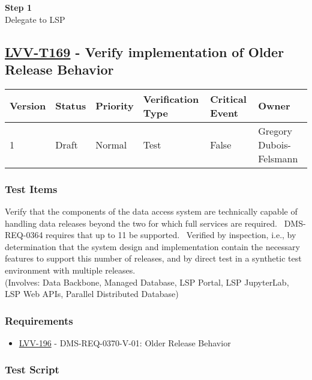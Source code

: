 \textbf{Step 1}\\
Delegate to LSP\\[2\baselineskip]

\hypertarget{lvv-t169---verify-implementation-of-older-release-behavior}{\subsection{\texorpdfstring{\href{https://jira.lsstcorp.org/secure/Tests.jspa\#/testCase/LVV-T169}{LVV-T169}
- Verify implementation of Older Release
Behavior}{LVV-T169 - Verify implementation of Older Release Behavior}}\label{lvv-t169---verify-implementation-of-older-release-behavior}}

\begin{longtable}[]{@{}llllll@{}}
\toprule
Version & Status & Priority & Verification Type & Critical Event &
Owner\tabularnewline
\midrule
\endhead
1 & Draft & Normal & Test & False & Gregory
Dubois-Felsmann\tabularnewline
\bottomrule
\end{longtable}

\subsubsection{Test Items}\label{test-items-33}

Verify that the components of the data access system are technically
capable of handling data releases beyond the two for which full services
are required. ~DMS-REQ-0364 requires that up to 11 be supported.
~Verified by inspection, i.e., by determination that the system design
and implementation contain the necessary features to support this number
of releases, and by direct test in a synthetic test environment with
multiple releases.\\
(Involves: Data Backbone, Managed Database, LSP Portal, LSP JupyterLab,
LSP Web APIs, Parallel Distributed Database)

\subsubsection{Requirements}\label{requirements-33}

\begin{itemize}
\tightlist
\item
  \href{https://jira.lsstcorp.org/browse/LVV-196}{LVV-196} -
  DMS-REQ-0370-V-01: Older Release Behavior
\end{itemize}

\subsubsection{Test Script}\label{test-script-33}


